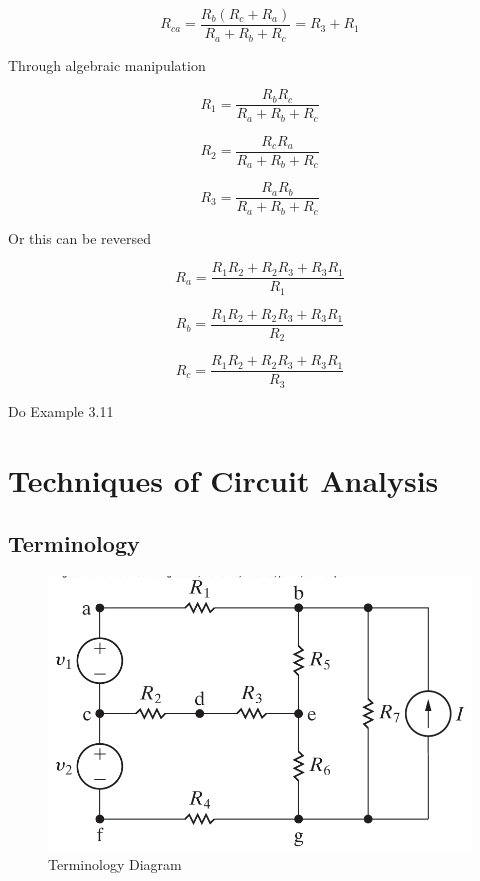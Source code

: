 \documentclass[14pt]{memoir}
\begin{document}
\begin{equation}
R_{ca} = \frac{R_b (R_c + R_a)}{R_a +R_b + R_c} = R_3 + R_1
\end{equation}

Through algebraic manipulation

\begin{equation}
R_1 = \frac{R_b R_c}{R_a + R_b + R_c}
\end{equation}

\begin{equation}
R_2 = \frac{R_c R_a}{R_a + R_b + R_c}
\end{equation}

\begin{equation}
R_3 = \frac{R_a R_b}{R_a + R_b + R_c}
\end{equation}

Or this can be reversed

\begin{equation}
R_a = \frac{R_1 R_2 + R_2 R_3 + R_3 R_1}{R_1}
\end{equation}

\begin{equation}
R_b = \frac{R_1 R_2 + R_2 R_3 + R_3 R_1}{R_2}
\end{equation}

\begin{equation}
R_c = \frac{R_1 R_2 + R_2 R_3 + R_3 R_1}{R_3}
\end{equation}


\begin{tcolorbox}
Do Example 3.11
\end{tcolorbox}


\chapter{Techniques of Circuit Analysis}

\section{Terminology}

\begin{figure}[H]
\begin{center}
\includegraphics[scale=0.50]{fig/fig04_03.png}
\caption{Terminology Diagram}
\label{fig:fig04_03}
\end{center}
\end{figure}
\end{document}
